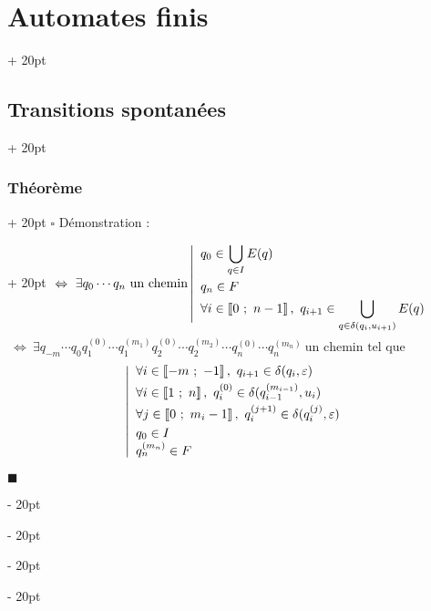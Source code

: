 \documentclass[a4paper, 12pt, twoside]{article}
\newcommand{\nset}[2]{\left\llbracket #1\ ;\ #2 \right\rrbracket}
\newcommand{\ssi}{\ \Leftrightarrow \ }
\newcommand{\ind}[1][20pt]{\advance\leftskip + #1}
\newcommand{\deind}[1][20pt]{\advance\leftskip - #1}
\newenvironment{indt}[2][20pt]{#2 \par \ind[#1]}{\par \deind} %
\newenvironment{proof}[1][{Démonstration :}]{\begin{indt}{$\square$ #1}}{$\blacksquare$ \end{indt}}
\begin{document}
\begin{indt}{\section{Automates finis}}
\begin{indt}{\subsection{Transitions spontanées}}
\begin{indt}{\subsubsection{Théorème}}
\begin{proof}
                    $
                        \ssi
                        \exists q_0 \cdots q_n\ \text{un chemin}
                        \left|
                        \begin{array}{l}
                            \displaystyle
                            q_0 \in \bigcup_{q \in I} E(q)
                            \vspace{3pt}
                            \\
                            q_n \in F
                            \vspace{3pt}
                            \\
                            \displaystyle
                            \forall i \in \nset 0 {n - 1},\ q_{i + 1} \in \bigcup_{q \in \delta(q_i, u_{i + 1})} E(q)
                            \vspace{-6pt}
                        \end{array}
                        \right.
                    $
                    \vspace{6pt}


                    $
                        \ssi
                        \exists q_{-m} \cdots q_0 q_1^{(0)} \cdots q_1^{(m_1)} q_2^{(0)} \cdots q_2^{(m_2)} \cdots q_n^{(0)} \cdots q_n^{(m_n)}\ \text{un chemin tel que}
                    $
                    \[
                        \left|
                        \begin{array}{l}
                            \forall i \in \nset{-m}{-1},\ q_{i + 1} \in \delta(q_i, \varepsilon)
                            \vspace{3pt}
                            \\
                            \forall i \in \nset 1 n,\ q_i^{(0)} \in \delta(q_{i - 1}^{(m_{i - 1})}, u_i)
                            \vspace{3pt}
                            \\
                            \forall j \in \nset 0 {m_i - 1},\ q_i^{(j + 1)} \in \delta(q_i^{(j)}, \varepsilon)
                            \vspace{3pt}
                            \\
                            q_0 \in I
                            \vspace{0pt}
                            \\
                            q_n^{(m_n)} \in F
                        \end{array}
                        \right.
                    \]


\end{proof}
\end{indt}
\end{indt}
\end{indt}
\end{document}
